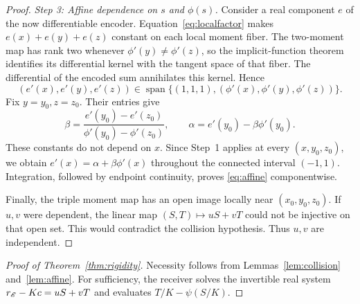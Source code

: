 \begin{proof}
\emph{Step 3: Affine dependence on $s$ and $\phi(s)$.}
Consider a real component $e$ of the now differentiable encoder. Equation~\eqref{eq:localfactor} makes $e(x)+e(y)+e(z)$ constant on each local moment fiber. The two-moment map has rank two whenever $\phi'(y)\ne\phi'(z)$, so the implicit-function theorem identifies its differential kernel with the tangent space of that fiber. The differential of the encoded sum annihilates this kernel. Hence
$$
 (e'(x),e'(y),e'(z))
 \in\operatorname{span}\{(1,1,1),(\phi'(x),\phi'(y),\phi'(z))\}.
$$
Fix $y=y_0,z=z_0$. Their entries give
$$
\beta=\frac{e'(y_0)-e'(z_0)}{\phi'(y_0)-\phi'(z_0)},
\qquad \alpha=e'(y_0)-\beta\phi'(y_0).
$$
These constants do not depend on $x$. Since Step~1 applies at every $(x,y_0,z_0)$, we obtain $e'(x)=\alpha+\beta\phi'(x)$ throughout the connected interval $(-1,1)$. Integration, followed by endpoint continuity, proves \eqref{eq:affine} componentwise.

Finally, the triple moment map has an open image locally near $(x_0,y_0,z_0)$. If $u,v$ were dependent, the linear map $(S,T)\mapsto uS+vT$ could not be injective on that open set. This would contradict the collision hypothesis. Thus $u,v$ are independent.
\end{proof}

\begin{proof}[Proof of Theorem~\ref{thm:rigidity}]
Necessity follows from Lemmas~\ref{lem:collision} and~\ref{lem:affine}. For sufficiency, the receiver solves the invertible real system $r_\mathscr E-Kc=uS+vT$ and evaluates $T/K-\psi(S/K)$.
\end{proof}
